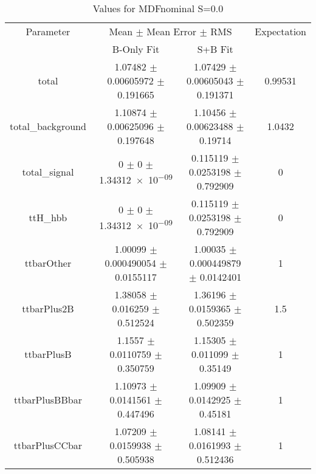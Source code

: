 \begin{table}
\centering
\caption{Values for MDFnominal S=0.0}
\begin{tabular}{cccc}
\toprule
Parameter & \multicolumn{2}{c}{Mean $\pm$ Mean Error $\pm$ RMS} & Expectation\\
 & B-Only Fit & S+B Fit & \\
\midrule
total & \num{1.07482} $\pm$ \num{0.00605972} $\pm$ \num{0.191665} & \num{1.07429} $\pm$ \num{0.00605043} $\pm$ \num{0.191371} & \num{0.99531}\\
total\_background & \num{1.10874} $\pm$ \num{0.00625096} $\pm$ \num{0.197648} & \num{1.10456} $\pm$ \num{0.00623488} $\pm$ \num{0.19714} & \num{1.0432}\\
total\_signal & \num{0} $\pm$ \num{0} $\pm$ \num{1.34312e-09} & \num{0.115119} $\pm$ \num{0.0253198} $\pm$ \num{0.792909} & \num{0}\\
ttH\_hbb & \num{0} $\pm$ \num{0} $\pm$ \num{1.34312e-09} & \num{0.115119} $\pm$ \num{0.0253198} $\pm$ \num{0.792909} & \num{0}\\
ttbarOther & \num{1.00099} $\pm$ \num{0.000490054} $\pm$ \num{0.0155117} & \num{1.00035} $\pm$ \num{0.000449879} $\pm$ \num{0.0142401} & \num{1}\\
ttbarPlus2B & \num{1.38058} $\pm$ \num{0.016259} $\pm$ \num{0.512524} & \num{1.36196} $\pm$ \num{0.0159365} $\pm$ \num{0.502359} & \num{1.5}\\
ttbarPlusB & \num{1.1557} $\pm$ \num{0.0110759} $\pm$ \num{0.350759} & \num{1.15305} $\pm$ \num{0.011099} $\pm$ \num{0.35149} & \num{1}\\
ttbarPlusBBbar & \num{1.10973} $\pm$ \num{0.0141561} $\pm$ \num{0.447496} & \num{1.09909} $\pm$ \num{0.0142925} $\pm$ \num{0.45181} & \num{1}\\
ttbarPlusCCbar & \num{1.07209} $\pm$ \num{0.0159938} $\pm$ \num{0.505938} & \num{1.08141} $\pm$ \num{0.0161993} $\pm$ \num{0.512436} & \num{1}\\
\bottomrule
\end{tabular}
\end{table}